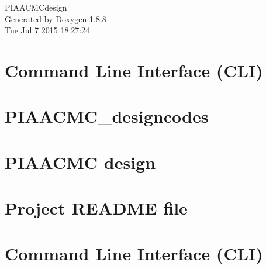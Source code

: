 \documentclass[twoside]{book}
\newcommand{\+}{\discretionary{\mbox{\scriptsize$\hookleftarrow$}}{}{}}
\newcommand{\clearemptydoublepage}{%
  \newpage{\pagestyle{empty}\cleardoublepage}%
}
\begin{document}
\hypersetup{pageanchor=false,
             bookmarks=true,
             bookmarksnumbered=true,
             pdfencoding=unicode
            }
\begin{titlepage}
\vspace*{7cm}
\begin{center}%
{\Large P\+I\+A\+A\+C\+M\+Cdesign }\\
\vspace*{1cm}
{\large Generated by Doxygen 1.8.8}\\
\vspace*{0.5cm}
{\small Tue Jul 7 2015 18:27:24}\\
\end{center}
\end{titlepage}
\clearemptydoublepage
\tableofcontents
\clearemptydoublepage
{}
\hypersetup{pageanchor=true}

\chapter{Command Line Interface (C\+L\+I)}
\label{md_PIAACMCdesign_src_CLIcore}
\hypertarget{md_PIAACMCdesign_src_CLIcore}{}

\chapter{P\+I\+A\+A\+C\+M\+C\+\_\+designcodes}
\label{md_PIAACMCdesign_src_PIAACMCsimul_PIAACMC_designcodes}
\hypertarget{md_PIAACMCdesign_src_PIAACMCsimul_PIAACMC_designcodes}{}

\chapter{P\+I\+A\+A\+C\+M\+C design}
\label{md_PIAACMCdesign_src_PIAACMCsimul_README}
\hypertarget{md_PIAACMCdesign_src_PIAACMCsimul_README}{}

\chapter{Project R\+E\+A\+D\+M\+E file}
\label{md_README}
\hypertarget{md_README}{}

\chapter{Command Line Interface (C\+L\+I)}
\label{md_src_CLIcore}
\hypertarget{md_src_CLIcore}{}

\end{document}
